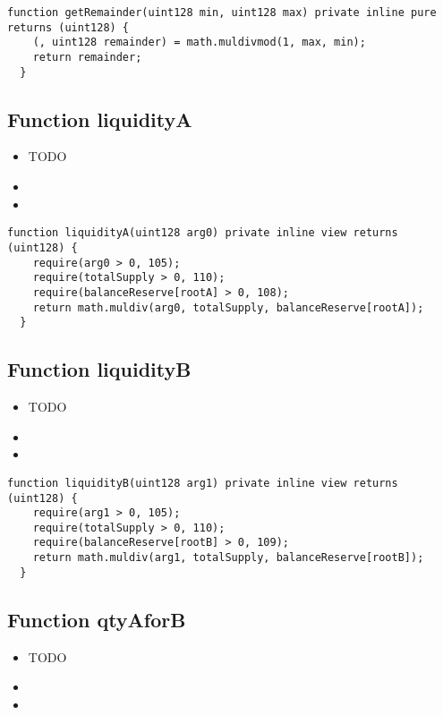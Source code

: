 \begin{lstlisting}[firstnumber=171]
  function getRemainder(uint128 min, uint128 max) private inline pure returns (uint128) {
    (, uint128 remainder) = math.muldivmod(1, max, min);
    return remainder;
  }
\end{lstlisting}

\subsection{Function liquidityA}

\begin{itemize}
\item TODO
\item \issueError{}
\item \issueInternal
\end{itemize}

\begin{lstlisting}[firstnumber=191]
  function liquidityA(uint128 arg0) private inline view returns (uint128) {
    require(arg0 > 0, 105);
    require(totalSupply > 0, 110);
    require(balanceReserve[rootA] > 0, 108);
    return math.muldiv(arg0, totalSupply, balanceReserve[rootA]);
  }
\end{lstlisting}

\subsection{Function liquidityB}

\begin{itemize}
\item TODO
\item \issueError{}
\item \issueInternal
\end{itemize}

\begin{lstlisting}[firstnumber=199]
  function liquidityB(uint128 arg1) private inline view returns (uint128) {
    require(arg1 > 0, 105);
    require(totalSupply > 0, 110);
    require(balanceReserve[rootB] > 0, 109);
    return math.muldiv(arg1, totalSupply, balanceReserve[rootB]);
  }
\end{lstlisting}

\subsection{Function qtyAforB}

\begin{itemize}
\item TODO
\item \issueError{}
\item \issueInternal
\end{itemize}

